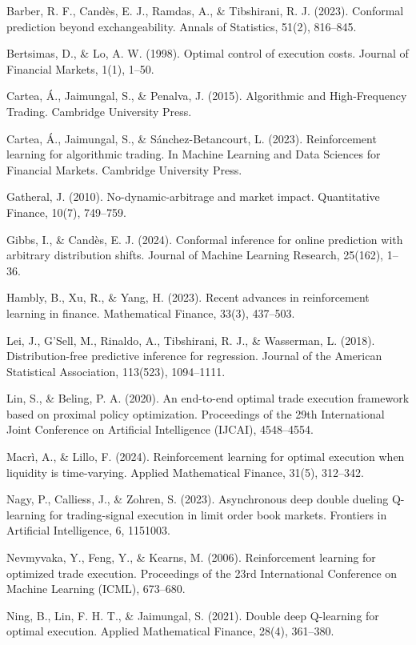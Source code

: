 Barber, R. F., Candès, E. J., Ramdas, A., \& Tibshirani, R. J. (2023).
Conformal prediction beyond exchangeability. Annals of Statistics,
51(2), 816--845.

Bertsimas, D., \& Lo, A. W. (1998). Optimal control of execution costs.
Journal of Financial Markets, 1(1), 1--50.

Cartea, Á., Jaimungal, S., \& Penalva, J. (2015). Algorithmic and
High-Frequency Trading. Cambridge University Press.

Cartea, Á., Jaimungal, S., \& Sánchez-Betancourt, L. (2023).
Reinforcement learning for algorithmic trading. In Machine Learning and
Data Sciences for Financial Markets. Cambridge University Press.

Gatheral, J. (2010). No-dynamic-arbitrage and market impact.
Quantitative Finance, 10(7), 749--759.

Gibbs, I., \& Candès, E. J. (2024). Conformal inference for online
prediction with arbitrary distribution shifts. Journal of Machine
Learning Research, 25(162), 1--36.

Hambly, B., Xu, R., \& Yang, H. (2023). Recent advances in reinforcement
learning in finance. Mathematical Finance, 33(3), 437--503.

Lei, J., G'Sell, M., Rinaldo, A., Tibshirani, R. J., \& Wasserman, L.
(2018). Distribution-free predictive inference for regression. Journal
of the American Statistical Association, 113(523), 1094--1111.

Lin, S., \& Beling, P. A. (2020). An end-to-end optimal trade execution
framework based on proximal policy optimization. Proceedings of the 29th
International Joint Conference on Artificial Intelligence (IJCAI),
4548--4554.

Macrì, A., \& Lillo, F. (2024). Reinforcement learning for optimal
execution when liquidity is time-varying. Applied Mathematical Finance,
31(5), 312--342.

Nagy, P., Calliess, J., \& Zohren, S. (2023). Asynchronous deep double
dueling Q-learning for trading-signal execution in limit order book
markets. Frontiers in Artificial Intelligence, 6, 1151003.

Nevmyvaka, Y., Feng, Y., \& Kearns, M. (2006). Reinforcement learning
for optimized trade execution. Proceedings of the 23rd International
Conference on Machine Learning (ICML), 673--680.

Ning, B., Lin, F. H. T., \& Jaimungal, S. (2021). Double deep Q-learning
for optimal execution. Applied Mathematical Finance, 28(4), 361--380.

